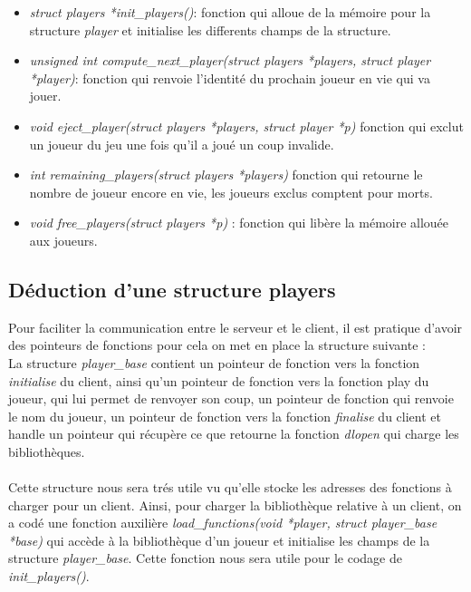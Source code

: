 \documentclass[12pt]{article}
\begin{document}
\begin{itemize}
\item \textit{struct players *init\_players()}: fonction qui alloue de la mémoire pour la structure \textit{player} et initialise les differents champs de la structure.\\
\item \textit{unsigned int compute\_next\_player(struct players *players, struct player *player)}: fonction qui renvoie l'identité du prochain joueur en vie qui va jouer.\\
\item\textit{void eject\_player(struct players *players, struct player *p)} fonction qui exclut un joueur du jeu une fois qu'il a joué un coup invalide.\\
\item\textit{int remaining\_players(struct players *players)} fonction qui retourne le nombre de joueur encore en vie, les joueurs exclus comptent pour morts.\\
\item \textit{void free\_players(struct players *p)} : fonction qui libère la mémoire allouée aux joueurs.\\
\end{itemize}

\subsection{Déduction d'une structure players}

Pour faciliter la communication entre le serveur et le client, il est pratique d'avoir des pointeurs de fonctions pour cela on met en place la structure suivante : \\

La structure \textit{player\_base} contient un pointeur de fonction vers la fonction \textit{initialise} du client, ainsi qu'un pointeur de fonction vers la fonction play du joueur, qui lui permet de renvoyer son coup, un pointeur de fonction qui renvoie le nom du joueur, un pointeur de fonction vers la fonction \textit{finalise} du client et handle un pointeur qui récupère ce que retourne la fonction \textit{dlopen} qui charge les bibliothèques.

\paragraph{}Cette structure nous sera trés utile vu qu'elle stocke les adresses des fonctions à charger pour un client.
Ainsi, pour charger la bibliothèque relative à un client, on a codé une fonction auxilière \textit{load\_functions(void *player, struct player\_base *base)} qui accède à la bibliothèque d'un joueur et initialise les champs de la structure \textit{player\_base}. Cette fonction nous sera utile pour le codage de \textit{init\_players()}.\newline
\end{document}
